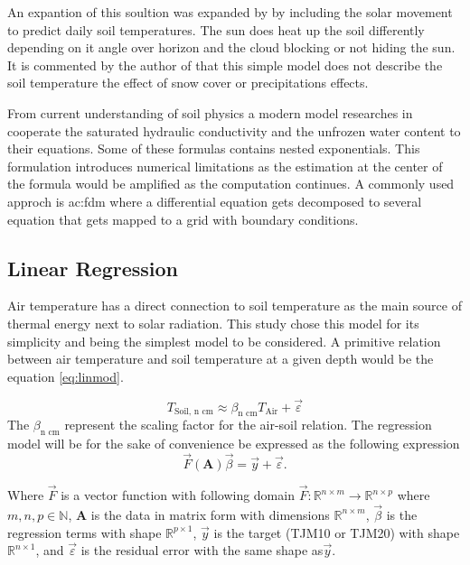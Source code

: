 An expantion of this soultion was expanded by \cite{roodenburg_estimating_1985} by including the solar movement to predict daily soil temperatures. The sun does heat up the soil differently depending on it angle over horizon and the cloud blocking or not hiding the sun. It is commented by the author of \cite{roodenburg_estimating_1985} that this simple model does not describe the soil temperature the effect of snow cover or precipitations effects.

From current understanding of soil physics a modern model researches in cooperate the saturated hydraulic conductivity and the unfrozen water content to their equations\cite{stuurop_influence_2022}. Some of these formulas contains nested exponentials\cite{stuurop_influence_2022}. This formulation introduces numerical limitations as the estimation at the center of the formula would be amplified as the computation continues. A commonly used approch is \acrfull{ac:fdm} where a differential equation gets decomposed to several equation that gets mapped to a grid with boundary conditions\cite{singh_numerical_2017,rankinen_simple_2004,cleall_analytical_2015}. 

\subsection{Linear Regression}\label{sec:theory:linreg}

Air temperature has a direct connection to soil temperature as the main source of thermal energy next to solar radiation. This study chose this model for its simplicity and being the simplest model to be considered. A primitive relation between air temperature and soil temperature at a given depth would be the equation \eqref{eq:linmod}.

\begin{equation}
	T_{\text{Soil, n cm}} \approx \beta_{\text{n cm}} T_{\text{Air}} + \vec{\varepsilon}\label{eq:linmod}
\end{equation}
The $\beta_{\text{n cm}}$ represent the scaling factor for the air-soil relation. The regression model will be for the sake of convenience be expressed as the following expression
\begin{equation}
	\vec{F}(\mathbf{A})\vec{\beta}=\vec{y}+\vec{\varepsilon}.
\end{equation}

Where $\vec{F}$ is a vector function with following domain $\vec{F}:\mathbb{R}^{n\times m}\to \mathbb{R}^{n\times p}$ where $m,n,p\in \mathbb{N}$, $\mathbf{A}$ is the data in matrix form with dimensions $\mathbb{R}^{n\times m}$, $\vec{\beta}$ is the regression terms with shape $\mathbb{R}^{p\times 1}$, $\vec{y}$ is the target (TJM10 or TJM20) with shape $\mathbb{R}^{n\times 1}$, and $\vec{\varepsilon}$ is the residual error with the same shape as$\vec{y}$.

